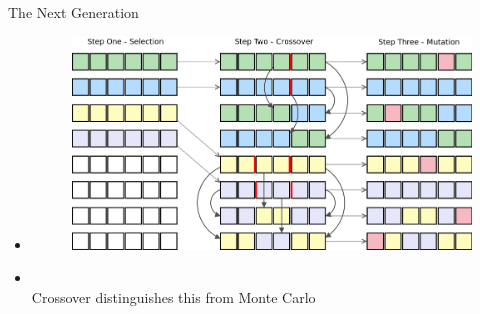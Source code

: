 \documentclass[10pt]{beamer}
\begin{document}
{%
\begin{frame}{The Next Generation}
	\begin{itemize}[<+->]
		\item[]{
		\begin{figure}
			\includegraphics[width=0.9\linewidth]{images/Genes_turingFinance.png}
		\end{figure}}
		\item[]{~\\Crossover distinguishes this from Monte Carlo}
	\end{itemize}
\end{frame}
}
\end{document}
